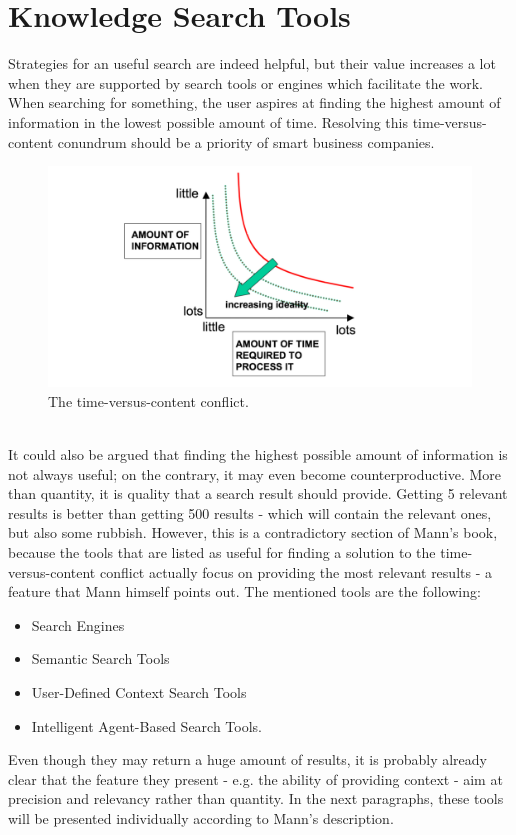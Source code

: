 \section{Knowledge Search Tools}
Strategies for an useful search are indeed helpful, but their value increases a lot when they are supported by search tools or engines which facilitate the work. 
When searching for something, the user aspires at finding the highest amount of information in the lowest possible amount of time. Resolving this time-versus-content conundrum should be a priority of smart business companies.\\
\begin{figure}[h]
	\centering
	\includegraphics[width=\textwidth]{pic3.png}
	\caption{The time-versus-content conflict. \cite{darrell2004hands}}
\end{figure}\\
It could also be argued that finding the highest possible amount of information is not always useful; on the contrary, it may even become counterproductive. More than quantity, it is quality that a search result should provide. Getting 5 relevant results is better than getting 500 results - which will contain the relevant ones, but also some rubbish. However, this is a contradictory section of Mann's book, because the tools that are listed as useful for finding a solution to the time-versus-content conflict actually focus on providing the most relevant results - a feature that Mann himself points out. The mentioned tools are the following:
\begin{itemize}
    \item Search Engines
    \item Semantic Search Tools
    \item User-Defined Context Search Tools
    \item Intelligent Agent-Based Search Tools.
\end{itemize}
Even though they may return a huge amount of results, it is probably already clear that the feature they present - e.g. the ability of providing context - aim at precision and relevancy rather than quantity. In the next paragraphs, these tools will be presented individually according to Mann's description.
